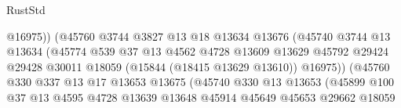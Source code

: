 \begin{lexlean}{RustStd}
\begin{coremodule}
                                            @16975))
                                        (@45760
                                          @3744
                                          @3827
                                          @13
                                          @18
                                          @13634
                                          @13676
                                          (@45740
                                            @3744
                                            @13
                                            @13634
                                            (@45774
                                              @539
                                              @37
                                              @13
                                              @4562
                                              @4728
                                              @13609
                                              @13629
                                              @45792
                                              @29424
                                              @29428
                                              @30011
                                              @18059
                                              (@15844 (@18415 @13629 @13610))
                                              @16975))
                                          (@45760
                                            @330
                                            @337
                                            @13
                                            @17
                                            @13653
                                            @13675
                                            (@45740
                                              @330
                                              @13
                                              @13653
                                              (@45899
                                                @100
                                                @37
                                                @13
                                                @4595
                                                @4728
                                                @13639
                                                @13648
                                                @45914
                                                @45649
                                                @45653
                                                @29662
                                                @18059

\end{coremodule}
\end{lexlean}
